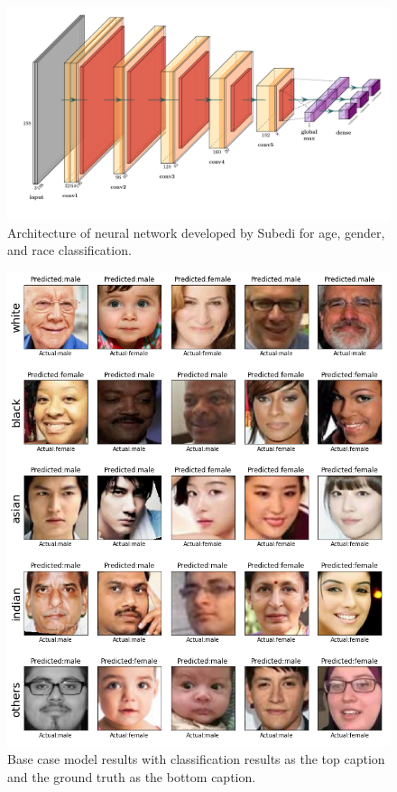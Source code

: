 \documentclass[obeyspaces, spaces, fleqn,10pt]{SelfArx} %
\begin{document}
\begin{figure}[ht]\centering %
\includegraphics[width=\linewidth]{img/subedi}
\caption{Architecture of neural network developed by Subedi for age, gender, and race classification.}
\label{fig:fig3}
\end{figure}

\begin{figure}[hp]\centering %
\includegraphics[width=.95\linewidth]{img/base-case-model-results}
\caption{Base case model results with classification results as the top caption and the ground truth as the bottom caption.}
\label{fig:fig4}
\end{figure}
\end{document}
